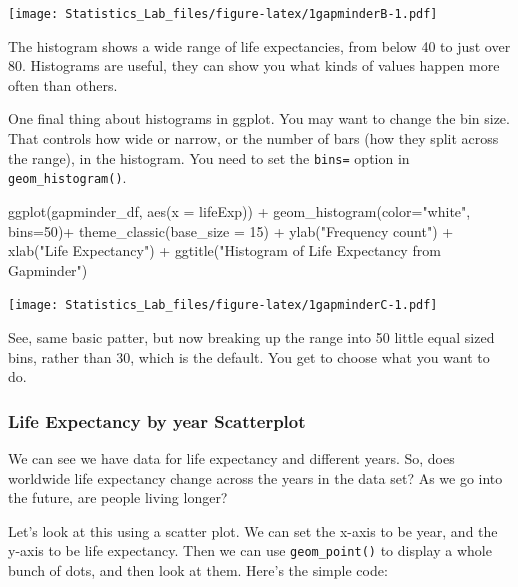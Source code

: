 \documentclass[
]{book}
\newenvironment{Shaded}{\begin{snugshade}}{\end{snugshade}}
\newcommand{\AttributeTok}[1]{\textcolor[rgb]{0.77,0.63,0.00}{#1}}
\newcommand{\DecValTok}[1]{\textcolor[rgb]{0.00,0.00,0.81}{#1}}
\newcommand{\FunctionTok}[1]{\textcolor[rgb]{0.00,0.00,0.00}{#1}}
\newcommand{\NormalTok}[1]{#1}
\newcommand{\SpecialCharTok}[1]{\textcolor[rgb]{0.00,0.00,0.00}{#1}}
\newcommand{\StringTok}[1]{\textcolor[rgb]{0.31,0.60,0.02}{#1}}
\begin{document}
\texttt{[image: Statistics\_Lab\_files/figure-latex/1gapminderB-1.pdf]}

The histogram shows a wide range of life expectancies, from below 40 to just over 80. Histograms are useful, they can show you what kinds of values happen more often than others.

One final thing about histograms in ggplot. You may want to change the bin size. That controls how wide or narrow, or the number of bars (how they split across the range), in the histogram. You need to set the \texttt{bins=} option in \texttt{geom\_histogram()}.

\begin{Shaded}
\begin{Highlighting}[]
\FunctionTok{ggplot}\NormalTok{(gapminder\_df, }\FunctionTok{aes}\NormalTok{(}\AttributeTok{x =}\NormalTok{ lifeExp)) }\SpecialCharTok{+}
  \FunctionTok{geom\_histogram}\NormalTok{(}\AttributeTok{color=}\StringTok{"white"}\NormalTok{, }\AttributeTok{bins=}\DecValTok{50}\NormalTok{)}\SpecialCharTok{+} 
  \FunctionTok{theme\_classic}\NormalTok{(}\AttributeTok{base\_size =} \DecValTok{15}\NormalTok{) }\SpecialCharTok{+}
  \FunctionTok{ylab}\NormalTok{(}\StringTok{"Frequency count"}\NormalTok{) }\SpecialCharTok{+} 
  \FunctionTok{xlab}\NormalTok{(}\StringTok{"Life Expectancy"}\NormalTok{) }\SpecialCharTok{+}
  \FunctionTok{ggtitle}\NormalTok{(}\StringTok{"Histogram of Life Expectancy from Gapminder"}\NormalTok{)}
\end{Highlighting}
\end{Shaded}

\texttt{[image: Statistics\_Lab\_files/figure-latex/1gapminderC-1.pdf]}

See, same basic patter, but now breaking up the range into 50 little equal sized bins, rather than 30, which is the default. You get to choose what you want to do.

\hypertarget{life-expectancy-by-year-scatterplot}{%
\subsubsection{Life Expectancy by year Scatterplot}\label{life-expectancy-by-year-scatterplot}}

We can see we have data for life expectancy and different years. So, does worldwide life expectancy change across the years in the data set? As we go into the future, are people living longer?

Let's look at this using a scatter plot. We can set the x-axis to be year, and the y-axis to be life expectancy. Then we can use \texttt{geom\_point()} to display a whole bunch of dots, and then look at them. Here's the simple code:
\end{document}
